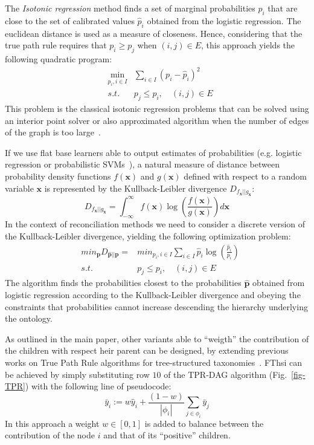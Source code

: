 \documentclass{bioinfo}
\newcommand{\wh}{\widehat}
\newcommand{\phat}{\wh{p}}
\newcommand{\bx}{\boldsymbol{x}}
\newcommand{\bphat}{\wh{\boldsymbol{p}}}
\newcommand{\bp}{\boldsymbol{p}}
\begin{document}
The {\em Isotonic regression} method finds a set of marginal probabilities $p_i$ that are close to the set of calibrated values $\phat_i$ obtained from the logistic regression.
The euclidean distance is used as a measure of closeness. Hence, considering that the true path rule requires that $p_i \geq p_j$ when $(i,j) \in E$, this approach yields the following quadratic program:
\begin{eqnarray}
& \min_{p_i, i \in I} & \sum_{i \in I} (p_i - \phat_i)^2 \nonumber \\ 
& s.t. & p_j \leq p_i, \quad (i,j) \in E
\end{eqnarray}
This problem is the classical isotonic regression problems that can be solved using an interior point solver or also approximated algorithm when the number of edges of the graph is too large~\citep{Burdakov06}.

If we use flat base learners able to output estimates of probabilities (e.g. logistic regression or probabilistic SVMs~\citep{Pla99}), a natural measure of distance between probability density functions $f(\bx)$ and $g(\bx)$ defined with respect to a random variable $\bx$ is represented by the Kullback-Leibler divergence $D_{f_{\bx} || g_{\bx}}$:
\begin{equation}
D_{f_{\bx} || g_{\bx}} = \int_{-\infty}^{\infty} f(\bx) \log\left(\frac{f(\bx)}{g(\bx)}\right) d\bx
\label{eq:KL-div}
\end{equation}
In the context of reconciliation methods we need to consider a discrete version of the Kullback-Leibler divergence, yielding the following optimization problem:
\begin{eqnarray}
& min_{\bp} D_{\bphat || \bp} = & min_{p_i, i \in I} \sum_{i \in I} \phat_i \log\left(\frac{\phat_i}{p_i}\right) \nonumber \\
& s.t. & p_j \leq p_i, \quad (i,j) \in E
\end{eqnarray}
The algorithm finds the probabilities closest to the probabilities $\bphat$ obtained from logistic regression  according to the Kullback-Leibler divergence and obeying the constraints that probabilities cannot increase descending the hierarchy underlying the ontology.


As outlined in the main paper, other variants able to ``weigth'' the contribution of the children with respect heir parent can be designed, by extending previous works on True Path Rule algorithms for tree-structured taxonomies~\cite{Vale09d,Vale12a}.
FThsi can be achieved by simply  substituting row $10$ of the {TPR-DAG} algorithm (Fig.~\ref{fig-TPR}) with the following line of pseudocode:
\begin{equation}
\bar{y}_i := w \hat{y}_i + \frac{(1 - w)}{|\phi_i|} \sum_{j \in \phi_i} \bar{y}_j
\label{eq:tpr-w}
\end{equation}
In this approach a weight $w \in [0,1]$ is added to balance between the contribution of the node $i$ and that of its ``positive'' children.
\end{document}
